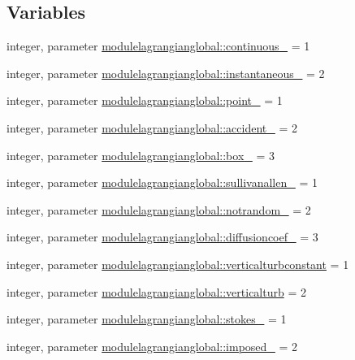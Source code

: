 \subsection*{Variables}
\begin{DoxyCompactItemize}
\item 
integer, parameter \mbox{\hyperlink{namespacemodulelagrangianglobal_a8b61ce3f8682c62861a88116a3e996c6}{modulelagrangianglobal\+::continuous\+\_\+}} = 1
\item 
integer, parameter \mbox{\hyperlink{namespacemodulelagrangianglobal_afa4d16ff75a79465c9bad1ce386b605b}{modulelagrangianglobal\+::instantaneous\+\_\+}} = 2
\item 
integer, parameter \mbox{\hyperlink{namespacemodulelagrangianglobal_a0e2936c4d3f8756df7e69214d86a68c8}{modulelagrangianglobal\+::point\+\_\+}} = 1
\item 
integer, parameter \mbox{\hyperlink{namespacemodulelagrangianglobal_aea177a9f2e4ac66e9e8d3e3cc735e14e}{modulelagrangianglobal\+::accident\+\_\+}} = 2
\item 
integer, parameter \mbox{\hyperlink{namespacemodulelagrangianglobal_abe305c7d37832b25e3f952623443842c}{modulelagrangianglobal\+::box\+\_\+}} = 3
\item 
integer, parameter \mbox{\hyperlink{namespacemodulelagrangianglobal_a08e467932d6264897e16243598eade92}{modulelagrangianglobal\+::sullivanallen\+\_\+}} = 1
\item 
integer, parameter \mbox{\hyperlink{namespacemodulelagrangianglobal_aeccfb91984729b43583821dc3314c765}{modulelagrangianglobal\+::notrandom\+\_\+}} = 2
\item 
integer, parameter \mbox{\hyperlink{namespacemodulelagrangianglobal_af88469420eef680ce4bde3a381893f5e}{modulelagrangianglobal\+::diffusioncoef\+\_\+}} = 3
\item 
integer, parameter \mbox{\hyperlink{namespacemodulelagrangianglobal_a7237091b820cfbc8c5aadba900d61813}{modulelagrangianglobal\+::verticalturbconstant}} = 1
\item 
integer, parameter \mbox{\hyperlink{namespacemodulelagrangianglobal_adf99dcbdc7860d8dcaced69e07c2d8d0}{modulelagrangianglobal\+::verticalturb}} = 2
\item 
integer, parameter \mbox{\hyperlink{namespacemodulelagrangianglobal_aee916b695fb6fabe1750e407b2ea2806}{modulelagrangianglobal\+::stokes\+\_\+}} = 1
\item 
integer, parameter \mbox{\hyperlink{namespacemodulelagrangianglobal_aaec25ae6657916add7716bbb766aa5c2}{modulelagrangianglobal\+::imposed\+\_\+}} = 2

\end{DoxyCompactItemize}
